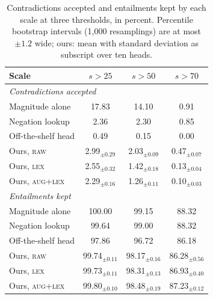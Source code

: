 \begin{table}[t]
\centering\small
\setlength{\tabcolsep}{2.5pt}
\begin{tabular}{l ccc}
\toprule
Scale & $s > 25$ & $s > 50$ & $s > 70$ \\
\midrule
\multicolumn{4}{l}{\emph{Contradictions accepted}} \\
\quad Magnitude alone & 17.83 & 14.10 & 0.91 \\
\quad Negation lookup & 2.36 & 2.30 & 0.85 \\
\quad Off-the-shelf head & 0.49 & 0.15 & 0.00 \\
\quad Ours, \textsc{raw} & 2.99$_{\pm 0.29}$ & 2.03$_{\pm 0.09}$ & 0.47$_{\pm 0.07}$ \\
\quad Ours, \textsc{lex} & 2.55$_{\pm 0.32}$ & 1.42$_{\pm 0.18}$ & 0.13$_{\pm 0.04}$ \\
\quad Ours, \textsc{aug+lex} & 2.29$_{\pm 0.16}$ & 1.26$_{\pm 0.11}$ & 0.10$_{\pm 0.03}$ \\
\multicolumn{4}{l}{\emph{Entailments kept}} \\
\quad Magnitude alone & 100.00 & 99.15 & 88.32 \\
\quad Negation lookup & 99.64 & 99.00 & 88.32 \\
\quad Off-the-shelf head & 97.86 & 96.72 & 86.18 \\
\quad Ours, \textsc{raw} & 99.74$_{\pm 0.11}$ & 98.17$_{\pm 0.16}$ & 86.28$_{\pm 0.56}$ \\
\quad Ours, \textsc{lex} & 99.73$_{\pm 0.11}$ & 98.31$_{\pm 0.13}$ & 86.93$_{\pm 0.40}$ \\
\quad Ours, \textsc{aug+lex} & 99.80$_{\pm 0.10}$ & 98.48$_{\pm 0.19}$ & 87.23$_{\pm 0.12}$ \\
\bottomrule
\end{tabular}
\caption{Contradictions accepted and entailments kept by each scale at three thresholds, in percent. Percentile bootstrap intervals (1{,}000 resamplings) are at most $\pm1.2$ wide; ours: mean with standard deviation as subscript over ten heads.}
\label{tab:decision}
\end{table}
